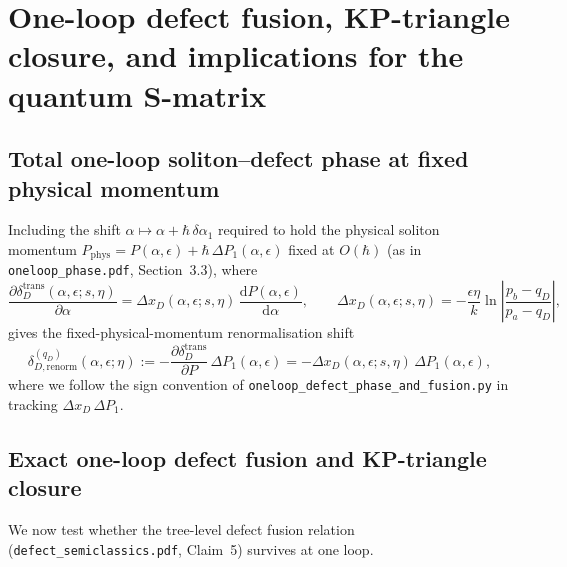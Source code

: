 \documentclass[11pt,a4paper]{article}
\newcommand{\dd}{\mathrm{d}}
\newcommand{\hb}{\hbar}
\begin{document}
\section{One-loop defect fusion, KP-triangle closure, and implications for the quantum S-matrix}
\label{sec:fusion}

\subsection{Total one-loop soliton--defect phase at fixed physical momentum}

Including the shift $\alpha \mapsto \alpha + \hb\,\delta\alpha_1$ required to
hold the physical soliton momentum $P_{\mathrm{phys}} = P(\alpha,\epsilon) + \hb\,\Delta P_1(\alpha,\epsilon)$
fixed at $O(\hb)$ (as in \texttt{oneloop\_phase.pdf}, Section~3.3), where
\begin{equation}\label{eq:dPdalpha_defect}
  \frac{\partial \delta_D^{\mathrm{trans}}(\alpha,\epsilon;s,\eta)}{\partial \alpha}
  = \Delta x_D(\alpha,\epsilon;s,\eta)\,\frac{\dd P(\alpha,\epsilon)}{\dd\alpha}, \qquad
  \Delta x_D(\alpha,\epsilon;s,\eta) = -\frac{\epsilon\eta}{k}\ln\left|\frac{p_b - q_D}{p_a - q_D}\right|,
\end{equation}
 gives the fixed-physical-momentum renormalisation shift
\begin{equation}\label{eq:delta_renorm_SD}
  \delta_{D,\mathrm{renorm}}^{(q_D)}(\alpha,\epsilon;\eta)
  := -\frac{\partial\delta_D^{\mathrm{trans}}}{\partial P}\,\Delta P_1(\alpha,\epsilon)
  = -\Delta x_D(\alpha,\epsilon;s,\eta)\,\Delta P_1(\alpha,\epsilon),
\end{equation}
where we follow the sign convention of \texttt{oneloop\_defect\_phase\_and\_fusion.py}
in tracking $\Delta x_D\,\Delta P_1$.

\subsection{Exact one-loop defect fusion and KP-triangle closure}

We now test whether the tree-level defect fusion relation
\cite{CZ2023} (\texttt{defect\_semiclassics.pdf}, Claim~5) survives at one loop.
\end{document}

